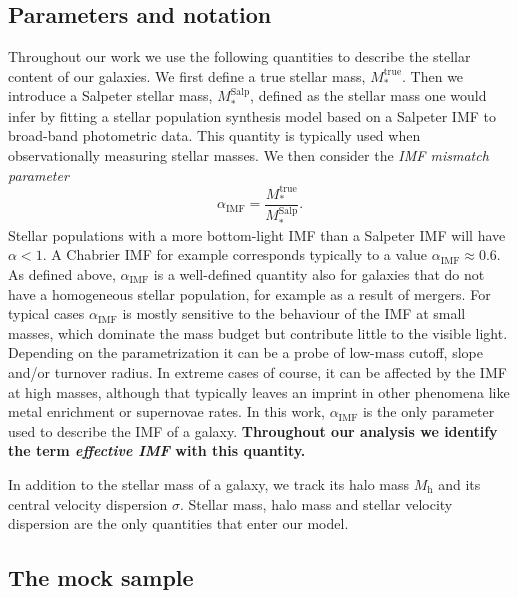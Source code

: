 \documentclass[usenatbib, letters]{mnras}
\def\mhalo{M_{\mathrm{h}}}
\def\mtrue{M_*^{\mathrm{true}}}
\def\msalp{M_*^{\mathrm{Salp}}}
\def\aimf{\alpha_{\mathrm{IMF}}}
\begin{document}
\subsection{Parameters and notation}
Throughout our work we use the following quantities to describe the stellar content of our galaxies. We first define a true stellar mass, $\mtrue$. Then we introduce a Salpeter stellar mass, $\msalp$, defined as the stellar mass one would infer by fitting a stellar population synthesis model based on a Salpeter IMF to broad-band photometric data. This quantity is typically used when observationally measuring stellar masses.
We then consider the {\em IMF mismatch parameter} \citep{Tre++10}
\begin{equation}\label{eq:aimf}
\aimf = \frac{\mtrue}{\msalp}.
\end{equation}
Stellar populations with a more bottom-light IMF than a Salpeter IMF will have $\alpha<1$. A Chabrier IMF for example corresponds typically to a value $\aimf\approx0.6$.
As defined above, $\aimf$ is a well-defined quantity also for galaxies that do not have a homogeneous stellar population, for example as a result of mergers.
For typical cases $\aimf$ is mostly sensitive to the behaviour of the IMF at small masses, which dominate the mass budget but contribute little to the visible light. Depending on the parametrization it can be a probe of low-mass cutoff, slope and/or turnover radius. In extreme cases of course, it can be affected by the IMF at high masses, although that typically leaves an imprint in other phenomena like metal enrichment or supernovae rates.
In this work, $\aimf$ is the only parameter used to describe the IMF of a galaxy. {\bf Throughout our analysis we identify the term {\em effective IMF} with this quantity.}

In addition to the stellar mass of a galaxy, we track its halo mass $\mhalo$ and its central velocity dispersion $\sigma$.
Stellar mass, halo mass and stellar velocity dispersion are the only quantities that enter our model.

\subsection{The mock sample}
\end{document}
